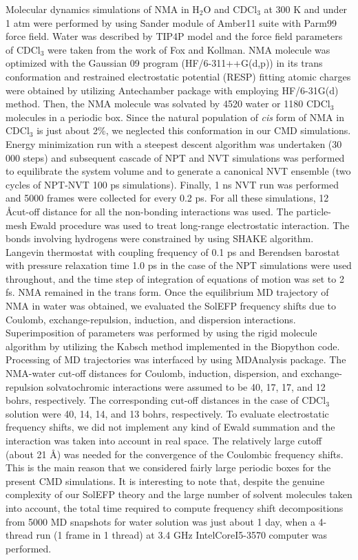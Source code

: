 \documentclass[a4paper,titlepage,twoside,fleqn,12pt]{book}
\begin{document}
\begin{appendices}
\begin{refsection}
Molecular dynamics simulations of NMA in H$_2$O and
CDCl$_3$ at 300 K and under 1 atm were performed by using
Sander module of {\sc Amber11} suite%
with Parm99 force field.%
Water was described by TIP4P model%
and the force field
parameters of CDCl$_3$ were taken from the work of Fox and
Kollman.%
NMA molecule was optimized with the {\sc Gaussian 09}
program (HF/6-311++G(d,p)) in its trans conformation
and restrained electrostatic potential (RESP) fitting atomic
charges%
were obtained by utilizing {\sc Antechamber} package%
with employing HF/6-31G(d) method.%
Then, the NMA
molecule was solvated by 4520 water or 1180 CDCl$_3$
molecules in a periodic box. Since the natural population of
\emph{cis} form of NMA in CDCl$_3$ is just about 2\%, we neglected this
conformation in our CMD simulations.%
Energy minimization
run with a steepest descent algorithm was undertaken (30 000
steps) and subsequent cascade of NPT and NVT simulations
was performed to equilibrate the system volume and to
generate a canonical NVT ensemble (two cycles of NPT\hyp{}NVT
100 ps simulations). Finally, 1 ns NVT run was performed
and 5000 frames were collected for every 0.2 ps. For all these
simulations, 12 \AA cut\hyp{}off distance for all the non-bonding
interactions was used. The particle\hyp{}mesh Ewald procedure%
was used to treat long\hyp{}range electrostatic interaction. The
bonds involving hydrogens were constrained by using SHAKE
algorithm.%
Langevin thermostat%
with coupling frequency
of 0.1 ps and Berendsen barostat%
with pressure relaxation
time 1.0 ps in the case of the NPT simulations were used
throughout, and the time step of integration of equations of
motion was set to 2 fs. NMA remained in the trans form.
Once the equilibrium MD trajectory of NMA in water
was obtained, we evaluated the SolEFP frequency shifts due
to Coulomb, exchange\hyp{}repulsion, induction, and dispersion
interactions. Superimposition of parameters was performed by
using the rigid molecule algorithm%
by utilizing the Kabsch
method%
implemented in the {\sc Biopython} code.%
Processing
of MD trajectories was interfaced by using MDAnalysis
package.%
The NMA\hyp{}water cut\hyp{}off distances for Coulomb,
induction, dispersion, and exchange\hyp{}repulsion solvatochromic
interactions were assumed to be 40, 17, 17, and 12 bohrs,
respectively. The corresponding cut\hyp{}off distances in the case of
CDCl$_3$ solution were 40, 14, 14, and 13 bohrs, respectively. To
evaluate electrostatic frequency shifts, we did not implement
any kind of Ewald summation and the interaction was taken
into account in real space. The relatively large cutoff (about
21 \AA) was needed for the convergence of the Coulombic
frequency shifts. This is the main reason that we considered
fairly large periodic boxes for the present CMD simulations. It is
interesting to note that, despite the genuine complexity of our
SolEFP theory and the large number of solvent molecules
taken into account, the total time required to compute
frequency shift decompositions from 5000 MD snapshots for
water solution was just about 1 day, when a 4\hyp{}thread run (1
frame in 1 thread) at 3.4 GHz Intel\textregistered Core\texttrademark I5\hyp{}3570 computer
was performed.


\end{refsection}
\end{appendices}
\end{document}
